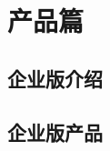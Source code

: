 \part{产品篇}
\label{par:product}


\clearpage
\chapter{企业版介绍} %
\label{cha:inst_intro}


\clearpage
\chapter{企业版产品} 
\label{cha:inst_product}


